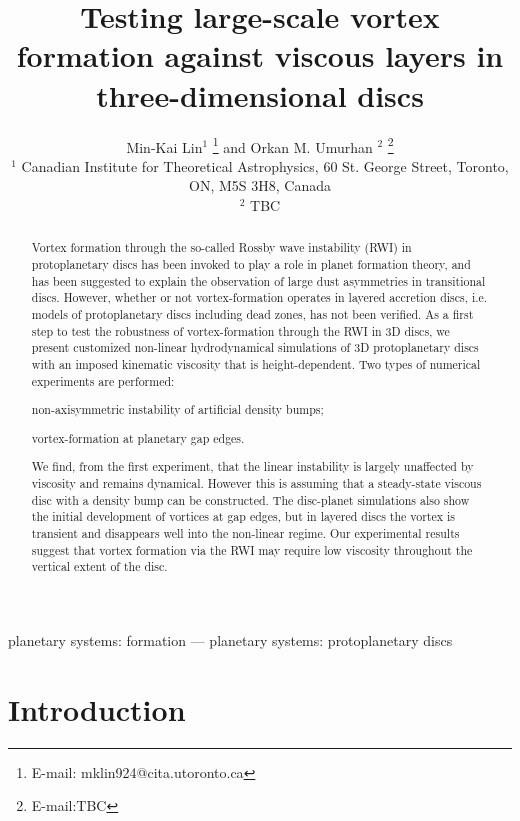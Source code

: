 \documentclass[useAMS,usenatbib]{mn2e}
\title[Vortices in viscous discs]{Testing large-scale 
  vortex formation against viscous layers in three-dimensional discs}
\author[Lin and Umurhan]{ Min-Kai Lin$^1$
  \thanks{E-mail: mklin924@cita.utoronto.ca} and Orkan M. Umurhan $^2$ \thanks{E-mail:TBC} \\
  $^1$ Canadian Institute for Theoretical Astrophysics,
  60 St. George Street, Toronto, ON, M5S 3H8, Canada \\
  $^2$ TBC
}
\begin{document}
\maketitle
\begin{abstract}
  Vortex formation through the so-called Rossby wave 
  instability (RWI) in protoplanetary discs has been invoked to play a
  role in planet formation theory, and has been suggested to explain
  the observation of large dust asymmetries in transitional discs.   
  However, whether or not vortex-formation operates in layered
  accretion discs, i.e. models of protoplanetary discs including dead zones, 
  has not been verified. As a first step to test the robustness of
  vortex-formation through the RWI in 3D discs, we present customized
  non-linear hydrodynamical
  simulations of 3D protoplanetary discs with an imposed kinematic
  viscosity that is height-dependent. Two types of numerical 
  experiments are performed:
  \begin{inparaenum}[(i)]
  \item non-axisymmetric instability of artificial
    density bumps;  
  \item vortex-formation at planetary gap edges.%
  \end{inparaenum}
   We find, from the first experiment, that the linear instability is largely unaffected by viscosity and remains dynamical. 
  However this is assuming that a steady-state viscous disc with a density bump can be constructed.  The disc-planet simulations 
  also show the initial development of vortices at gap edges, but in layered discs the vortex is transient and disappears 
  well into the non-linear regime. Our experimental results suggest that vortex
  formation via the RWI may require low viscosity throughout the 
  vertical extent of the disc. 
\end{abstract}

\begin{keywords}
planetary systems: formation --- planetary systems:
protoplanetary discs
\end{keywords}


\section{Introduction}\label{intro}

\end{document}
